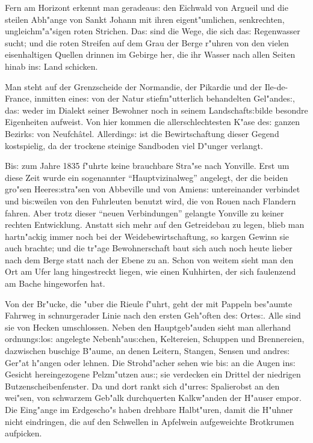 \documentclass[oneside,12pt]{book}
\newcommand{\s}{s:}%
\begin{document}
Fern am Horizont erkennt man geradeau{\s} den Eichwald von Argueil
und die steilen Abh"ange von Sankt Johann mit ihren eigent"umlichen,
senkrechten, ungleichm"a"sigen roten Strichen. Da{\s} sind die
Wege, die sich da{\s} Regenwasser sucht; und die roten Streifen
auf dem Grau der Berge r"uhren von den vielen eisenhaltigen
Quellen drinnen im Gebirge her, die ihr Wasser nach allen Seiten
hinab in{\s} Land schicken.

Man steht auf der Grenzscheide der Normandie, der Pikardie und der
Ile-de-France, inmitten eine{\s} von der Natur stiefm"utterlich
behandelten Ge\-l"ande{\s}, da{\s} weder im Dialekt seiner Bewohner
noch in seinem Landschaft{\s}bilde besondre Eigenheiten aufweist.
Von hier kommen die allerschlechtesten K"ase de{\s} ganzen
Bezirk{\s} von Neufch\^atel. Allerding{\s} ist die Bewirtschaftung
dieser Gegend kostspielig, da der trockene steinige Sandboden viel
D"unger verlangt.

Bi{\s} zum Jahre 1835 f"uhrte keine brauchbare Stra"se nach
Yonville. Erst um diese Zeit wurde ein sogenannter
"`Hauptvizinalweg"' angelegt, der die beiden gro"sen
Heere{\s}stra"sen von Abbeville und von Amien{\s} untereinander
verbindet und bi{\s}weilen von den Fuhrleuten benutzt wird, die
von Rouen nach Flandern fahren. Aber trotz dieser "`neuen
Verbindungen"' gelangte Yonville zu keiner rechten Entwicklung.
Anstatt sich mehr auf den Getreidebau zu legen, blieb man
hartn"ackig immer noch bei der Weidebewirtschaftung, so kargen
Gewinn sie auch brachte; und die tr"age Bewohnerschaft baut sich
auch noch heute lieber nach dem Berge statt nach der Ebene zu an.
Schon von weitem sieht man den Ort am Ufer lang hingestreckt
liegen, wie einen Kuhhirten, der sich faulenzend am Bache
hingeworfen hat.

Von der Br"ucke, die "uber die Rieule f"uhrt, geht der mit Pappeln
bes"aumte Fahrweg in schnurgerader Linie nach den ersten Geh"often
de{\s} Orte{\s}. Alle sind sie von Hecken umschlossen. Neben den
Hauptgeb"auden sieht man allerhand ordnung{\s}lo{\s} angelegte
Nebenh"au{\s}chen, Keltereien, Schuppen und Brennereien,
dazwischen buschige B"aume, an denen Leitern, Stangen, Sensen und
andre{\s} Ger"at h"angen oder lehnen. Die Strohd"acher sehen wie
bi{\s} an die Augen in{\s} Gesicht hereingezogene Pelzm"utzen
au{\s}; sie verdecken ein Drittel der niedrigen
Butzenscheibenfenster. Da und dort rankt sich d"urre{\s}
Spalierobst an den wei"sen, von schwarzem Geb"alk durchquerten
Kalkw"anden der H"auser empor. Die Eing"ange im Erdgescho"s haben
drehbare Halbt"uren, damit die H"uhner nicht eindringen, die auf
den Schwellen in Apfelwein aufgeweichte Brotkrumen aufpicken.
\end{document}
